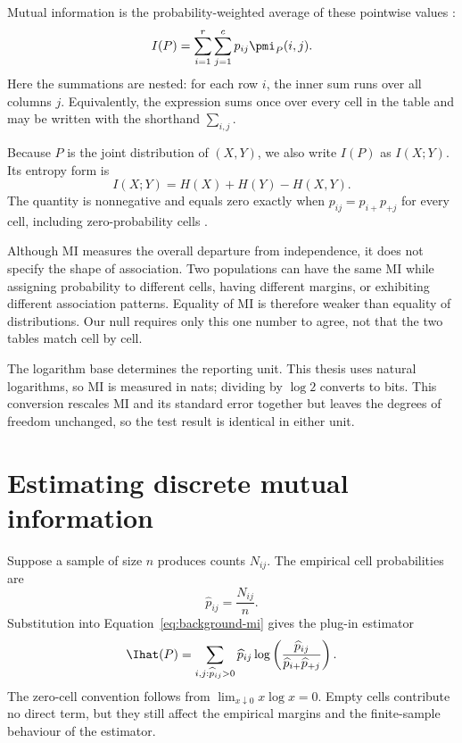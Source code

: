 Mutual information is the probability-weighted average of these pointwise
values \citep{shannon1948,bossomaier2016}:
\begin{equation}
  I(P)
  =\sum_{i=1}^{r}\sum_{j=1}^{c}p_{ij}\pmi_P(i,j).
  \label{eq:background-mi}
\end{equation}
Here the summations are nested: for each row \(i\), the inner sum runs over
all columns \(j\). Equivalently, the expression sums once over every cell in
the table and may be written with the shorthand \(\sum_{i,j}\).

Because \(P\) is the joint distribution of \((X,Y)\), we also write
\(I(P)\) as \(I(X;Y)\). Its entropy form is
\begin{equation}
  I(X;Y)=H(X)+H(Y)-H(X,Y).
  \label{eq:mi-entropy-form}
\end{equation}
The quantity is nonnegative and equals zero exactly when
\(p_{ij}=p_{i+}p_{+j}\) for every cell, including zero-probability cells
\citep{bossomaier2016}.

Although MI measures the overall departure from independence, it does not
specify the shape of association. Two populations can have the same MI while assigning
probability to different cells, having different margins, or exhibiting
different association patterns. Equality of MI is therefore weaker than
equality of distributions. Our null requires only this one number to agree,
not that the two tables match cell by cell.

The logarithm base determines the reporting unit. This thesis uses natural
logarithms, so MI is measured in nats; dividing by \(\log 2\) converts to bits.
This conversion rescales MI and its standard error together but leaves the
degrees of freedom unchanged, so the test result is identical in either unit.

\section{Estimating discrete mutual information}
\label{sec:background-mi-bias}

Suppose a sample of size \(n\) produces counts \(N_{ij}\). The empirical cell
probabilities are
\begin{equation}
  \widehat p_{ij}=\frac{N_{ij}}{n}.
\end{equation}
Substitution into Equation~\eqref{eq:background-mi} gives the plug-in estimator
\begin{equation}
  \Ihat(P)
  =\sum_{i,j:\widehat p_{ij}>0}
  \widehat p_{ij}
  \log\left(
  \frac{\widehat p_{ij}}
       {\widehat p_{i+}\widehat p_{+j}}
  \right).
  \label{eq:plugin-mi-background}
\end{equation}
The zero-cell convention follows from
\(\lim_{x\downarrow0}x\log x=0\). Empty cells contribute no direct term, but
they still affect the empirical margins and the finite-sample behaviour of the
estimator.

